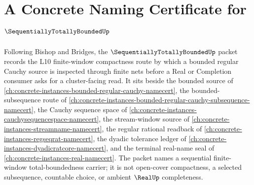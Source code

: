\chapter{A Concrete Naming Certificate for $\SequentiallyTotallyBoundedUp$}
\label{ch:concrete-instances-sequentially-totally-bounded-namecert}

Following Bishop and Bridges, the $\SequentiallyTotallyBoundedUp$ packet records the L10 finite-window compactness route by which a bounded regular Cauchy source is inspected through finite nets before a Real or Completion consumer asks for a cluster-facing read. It sits beside the bounded source of \autoref{ch:concrete-instances-bounded-regular-cauchy-namecert}, the bounded-subsequence route of \autoref{ch:concrete-instances-bounded-regular-cauchy-subsequence-namecert}, the Cauchy sequence space of \autoref{ch:concrete-instances-cauchysequencespace-namecert}, the stream-window source of \autoref{ch:concrete-instances-streamname-namecert}, the regular rational readback of \autoref{ch:concrete-instances-regseqrat-namecert}, the dyadic tolerance ledger of \autoref{ch:concrete-instances-dyadicratcore-namecert}, and the terminal real-name seal of \autoref{ch:concrete-instances-real-namecert}. The packet names a sequential finite-window total-boundedness carrier; it is not open-cover compactness, a selected subsequence, countable choice, or ambient $\RealUp$ completeness.

